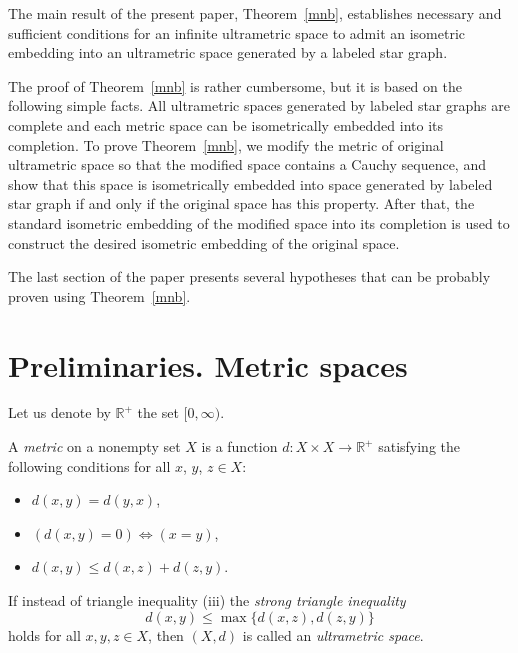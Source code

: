 \documentclass[11pt]{article}
\theoremstyle{definition}
\theoremstyle{remark}
\numberwithin{equation}{section}
\begin{document}
The main result of the present paper, Theorem~\ref{mnb}, establishes necessary and sufficient conditions for an infinite ultrametric space to admit an isometric embedding into an ultrametric space generated by a labeled star graph.

The proof of Theorem~\ref{mnb} is rather cumbersome, but it is based on the following simple facts. All ultrametric spaces generated by labeled star graphs
are complete and each metric space 
can be isometrically embedded into 
its completion. To prove Theorem~\ref{mnb}, we modify the 
metric of original ultrametric 
space so that the modified 
space contains a Cauchy sequence, 
and show that this 
space is isometrically 
embedded into space generated 
by labeled star graph if and 
only if the original space has 
this property. After that, the 
standard isometric embedding 
of the modified space into its 
completion is used to 
construct the desired isometric 
embedding of the original space. 

The last section of the paper presents several hypotheses that can be probably proven using Theorem~\ref{mnb}.







\section{Preliminaries. Metric spaces}


\hspace{5 mm} Let us denote by $\mathbb{R}^+$ the set $[0, \infty)$.


A \textit{metric} on a nonempty set $X$ is a function $d\colon X\times X\rightarrow \mathbb R^+$ satisfying the following conditions for all 
 \(x\), \(y\), \(z \in X\):
\begin{itemize}[left=10pt]
\item[(i)]  $d(x,y)=d(y,x)$,
\item[(ii)] $(d(x,y)=0)\iff (x=y)$,
\item[(iii)] \(d(x,y)\leq d(x,z) + d(z,y)\).
\end{itemize}


If instead of triangle inequality (iii) the {\it strong triangle inequality}
\begin{equation*}
d(x,y) \leq \max\{d(x,z), d(z,y)\}
\end{equation*}
holds for all $x,y,z \in X$, then $(X,d)$ is called an \emph{ultrametric space}.
\end{document}
